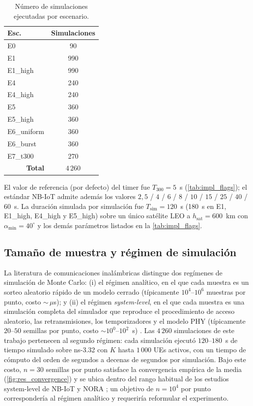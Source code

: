 \begin{table}[H]
\centering
\caption{Número de simulaciones ejecutadas por escenario.}
\label{tab:res_config}
\small
\renewcommand{\arraystretch}{1.15}
\begin{tabular}{@{}l c@{}}
\toprule
\textbf{Esc.} & \textbf{Simulaciones} \\
\midrule
E0          & 90  \\
E1          & 990 \\
E1\_high    & 990 \\
E4          & 240 \\
E4\_high    & 240 \\
E5          & 360 \\
E5\_high    & 360 \\
E6\_uniform & 360 \\
E6\_burst   & 360 \\
E7\_t300    & 270 \\
\midrule
\multicolumn{1}{r}{\textbf{Total}} & $4\,260$ \\
\bottomrule
\end{tabular}
\end{table}

El valor de referencia (por defecto) del timer fue $T_{300}=5$~s (\cref{tab:impl_flags}); el estándar NB-IoT \cite{ref18} admite además los valores $2{,}5$ / $4$ / $6$ / $8$ / $10$ / $15$ / $25$ / $40$ / $60$~s. La duración simulada por simulación fue $T_{\text{sim}}=120$~s (180~s en E1, E1\_high, E4\_high y E5\_high) sobre un único satélite LEO a $h_{\text{sat}}=600$~km con $\alpha_{\min}=40^\circ$ y los demás parámetros listados en la \cref{tab:impl_flags}.

\subsection{Tamaño de muestra y régimen de simulación}
\label{sec:res_config_n}

La literatura de comunicaciones inalámbricas distingue dos regímenes de simulación de Monte Carlo: (i) el régimen analítico, en el que cada muestra es un sorteo aleatorio rápido de un modelo cerrado (típicamente $10^{4}$--$10^{6}$ muestras por punto, costo $\sim$\,$\mu$s); y (ii) el régimen \emph{system-level}, en el que cada muestra es una simulación completa del simulador que reproduce el procedimiento de acceso aleatorio, las retransmisiones, los temporizadores y el modelo PHY (típicamente $20$--$50$ semillas por punto, costo $\sim 10^{0}$--$10^{2}$~s) \cite{ref22,ref23}. Las $4\,260$ simulaciones de este trabajo pertenecen al segundo régimen: cada simulación ejecutó $120$--$180$~s de tiempo simulado sobre ns-3.32 con $K$ hasta $1\,000$ UEs activos, con un tiempo de cómputo del orden de segundos a decenas de segundos por simulación. Bajo este costo, $n=30$ semillas por punto satisface la convergencia empírica de la media (\cref{fig:res_convergence}) y se ubica dentro del rango habitual de los estudios system-level de NB-IoT y NORA \cite{ref4,ref24}; un objetivo de $n=10^{4}$ por punto correspondería al régimen analítico y requeriría reformular el experimento.

